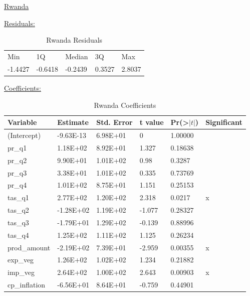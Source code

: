 \documentclass[11pt]{article}
\begin{document}
\newpage
\begin{center} \underline{Rwanda}\\ \end{center}
\underline{Residuals:}
\FloatBarrier
\begin{table}[!htbp]
\centering

\begin{tabular}{lllll}
Min     & 1Q      & Median  & 3Q     & Max    \\
-1.4427 & -0.6418 & -0.2439 & 0.3527 & 2.8037
\end{tabular}
\caption{Rwanda Residuals}
\label{table9}
\end{table}
\FloatBarrier

\underline{Coefficients:}
\FloatBarrier
\begin{table}[!htbp]
\centering
\begin{tabular}{llllll}
\hline
Variable      & Estimate  & Std. Error & t value & Pr(\textgreater$|t|$) & Significant \\ \hline
(Intercept)   & -9.63E-13 & 6.98E+01   & 0       & 1.00000             &             \\
pr\_q1        & 1.18E+02  & 8.92E+01   & 1.327   & 0.18638             &             \\
pr\_q2        & 9.90E+01  & 1.01E+02   & 0.98    & 0.3287              &             \\
pr\_q3        & 3.38E+01  & 1.01E+02   & 0.335   & 0.73769             &             \\
pr\_q4        & 1.01E+02  & 8.75E+01   & 1.151   & 0.25153             &             \\
tas\_q1       & 2.77E+02  & 1.20E+02   & 2.318   & 0.0217              & x           \\
tas\_q2       & -1.28E+02 & 1.19E+02   & -1.077  & 0.28327             &             \\
tas\_q3       & -1.79E+01 & 1.29E+02   & -0.139  & 0.88996             &             \\
tas\_q4       & 1.25E+02  & 1.11E+02   & 1.125   & 0.26234             &             \\
prod\_amount  & -2.19E+02 & 7.39E+01   & -2.959  & 0.00355             & x           \\
exp\_veg      & 1.26E+02  & 1.02E+02   & 1.234   & 0.21882             &             \\
imp\_veg      & 2.64E+02  & 1.00E+02   & 2.643   & 0.00903             & x           \\
cp\_inflation & -6.56E+01 & 8.64E+01   & -0.759  & 0.44901             &            \\ \hline
\end{tabular}
\caption{Rwanda Coefficients}
\label{table10}
\end{table}
\FloatBarrier
\end{document}
